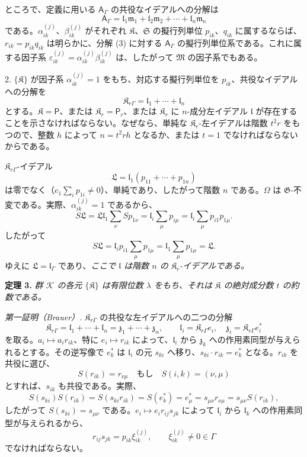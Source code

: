 ところで、定義に用いる \(\mathsf{A}_\Gamma\) の共役なイデアルへの分解は
\[
\tag{3}
\mathsf{A}_\Gamma=\mathfrak l_1\mathfrak m_1+\mathfrak l_2\mathfrak m_2+\cdots+\mathfrak l_n\mathfrak m_n
\]
である。\(\alpha_{ik}^{(j)}\)、\(\beta_{ik}^{(j)}\) がそれぞれ \(\mathfrak K\)、\(\mathfrak S\) の擬行列単位 \(p_{ik}\)、\(q_{ik}\) に属するならば、\(r_{ik}=p_{ik}q_{ik}\) は明らかに、分解 (3) に対する \(\mathsf{A}_\Gamma\) の擬行列単位系である。これに属する因子系 \(\varepsilon_{ik}^{(j)}=\alpha_{ik}^{(j)}\beta_{ik}^{(j)}\) は、したがって \(\mathfrak M\) の因子系でもある。

2. \(\{\mathfrak K\}\) が因子系 \(\alpha_{ik}^{(j)}=1\) をもち、対応する擬行列単位を \(p_{ik}\)、共役なイデアルへの分解を
\[
\mathfrak K_{r\Gamma}=\mathfrak l_1+\cdots+\mathfrak l_n
\]
とする。\(\mathfrak K=\mathsf P\)、または \(\mathfrak K_r=\mathsf P_r\)、または \(\mathfrak K_r\) に \(n\)-成分左イデアル \(\mathfrak l\) が存在することを示さなければならない。なぜなら、単純な \(\mathfrak K_r\)-左イデアルは階数 \(t^2r\) をもつので、整数 \(h\) によって \(n=t^2rh\) となるか、または \(t=1\) でなければならないからである。

\(\mathfrak K_{r\Gamma}\)-イデアル
\[
\mathfrak L=\mathfrak l_1(p_{11}+\cdots+p_{1n})
\]
は零でなく（\(e_1\sum_i p_{1i}\ne0\)）、単純であり、したがって階数 \(n\) である。\(\Omega\) は \(\mathfrak G\)-不変である。実際、\(\alpha_{ik}^{(j)}=1\) であるから、
\[
S\mathfrak L
=\mathfrak L\mathfrak l_1\sum_\nu S p_{1\nu}
=\mathfrak l_i\sum_\mu p_{i\mu}
=\mathfrak l_i\sum_\mu p_{i1}p_{1\mu}.
\]
したがって
\[
S\mathfrak L=\mathfrak l_ip_{i1}\sum_\mu p_{1\mu}
=\mathfrak l_1\sum_\mu p_{1\mu}
=\mathfrak L.
\]
ゆえに \(\mathfrak L=\mathfrak l_\Gamma\) であり、\emph{ここで \(\mathfrak l\) は階数 \(n\) の \(\mathfrak K_r\)-イデアルである。}

\textbf{定理 3.} \emph{群 \(\mathscr K\) の各元 \(\{\mathfrak K\}\) は有限位数 \(\lambda\) をもち、それは \(\mathfrak K\) の絶対成分数 \(t\) の約数である。}

\emph{第一証明（Brauer）.} \(\mathfrak K_{r\Gamma}\) の共役な左イデアルへの二つの分解
\[
\mathfrak K_{r\Gamma}=\mathfrak l_1+\cdots+\mathfrak l_n
=\mathfrak z_1+\cdots+\mathfrak z_n,\qquad
\mathfrak l_i=\mathfrak K_{r\Gamma}e_i,\quad
\mathfrak z_i=\mathfrak K_{r\Gamma}e_i^*
\]
を取る。\(a_i\mapsto a_ir_{ik}\)、特に \(e_i\mapsto r_{ik}\) によって、\(\mathfrak l_i\) から \(\mathfrak z_k\) への作用素同型が与えられるとする。その逆写像で \(e_k^*\) は \(\mathfrak l_i\) の元 \(s_{ki}\) へ移り、\(s_{ki}\cdot r_{ik}=e_k^*\) となる。\(r_{ik}\) を共役に選び、
\[
S(r_{ik})=r_{\nu\mu}\quad\text{もし}\quad S(i,k)=(\nu,\mu)
\]
とすれば、\(s_{ik}\) も共役である。実際、
\[
S(s_{ki})S(r_{ik})=S(s_{ki}r_{ik})=S(e_k^*)=e_\mu^*
=s_{\mu\nu}r_{\nu\mu}=s_{\mu\nu}S(r_{ik}),
\]
したがって \(S(s_{ki})=s_{\mu\nu}\) である。\(e_i\mapsto e_ir_{ij}s_{jk}\) によって \(\mathfrak l_i\) から \(\mathfrak l_k\) への作用素同型が与えられるから、
\[
r_{ij}s_{jk}=p_{ik}\xi_{ik}^{(j)},\qquad
\xi_{ik}^{(j)}\ne0\in\Gamma
\]
でなければならない。

